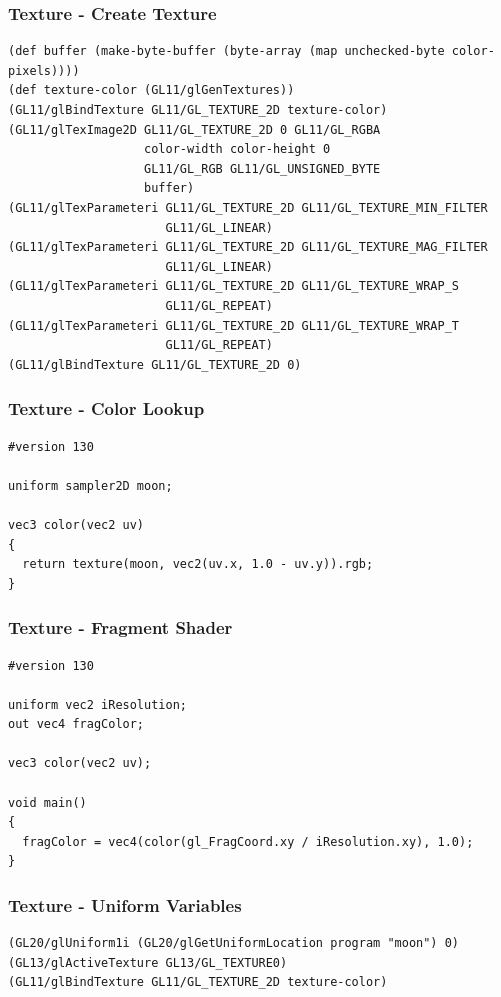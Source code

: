 \documentclass[aspectratio=169,11pt,xcolor=dvipsnames]{beamer}
\begin{document}
\begin{frame}[fragile]
  \frametitle{Texture {-} Create Texture}
  \begin{verbatim}
(def buffer (make-byte-buffer (byte-array (map unchecked-byte color-pixels))))
(def texture-color (GL11/glGenTextures))
(GL11/glBindTexture GL11/GL_TEXTURE_2D texture-color)
(GL11/glTexImage2D GL11/GL_TEXTURE_2D 0 GL11/GL_RGBA
                   color-width color-height 0
                   GL11/GL_RGB GL11/GL_UNSIGNED_BYTE
                   buffer)
(GL11/glTexParameteri GL11/GL_TEXTURE_2D GL11/GL_TEXTURE_MIN_FILTER
                      GL11/GL_LINEAR)
(GL11/glTexParameteri GL11/GL_TEXTURE_2D GL11/GL_TEXTURE_MAG_FILTER
                      GL11/GL_LINEAR)
(GL11/glTexParameteri GL11/GL_TEXTURE_2D GL11/GL_TEXTURE_WRAP_S
                      GL11/GL_REPEAT)
(GL11/glTexParameteri GL11/GL_TEXTURE_2D GL11/GL_TEXTURE_WRAP_T
                      GL11/GL_REPEAT)
(GL11/glBindTexture GL11/GL_TEXTURE_2D 0)
  \end{verbatim}
\end{frame}

\begin{frame}[fragile]
  \frametitle{Texture {-} Color Lookup}
  \begin{verbatim}
#version 130

uniform sampler2D moon;

vec3 color(vec2 uv)
{
  return texture(moon, vec2(uv.x, 1.0 - uv.y)).rgb;
}
  \end{verbatim}
\end{frame}

\begin{frame}[fragile]
  \frametitle{Texture {-} Fragment Shader}
  \begin{verbatim}
#version 130

uniform vec2 iResolution;
out vec4 fragColor;

vec3 color(vec2 uv);

void main()
{
  fragColor = vec4(color(gl_FragCoord.xy / iResolution.xy), 1.0);
}
  \end{verbatim}
\end{frame}

\begin{frame}[fragile]
  \frametitle{Texture {-} Uniform Variables}
  \begin{verbatim}
(GL20/glUniform1i (GL20/glGetUniformLocation program "moon") 0)
(GL13/glActiveTexture GL13/GL_TEXTURE0)
(GL11/glBindTexture GL11/GL_TEXTURE_2D texture-color)
  \end{verbatim}
\end{frame}
\end{document}
